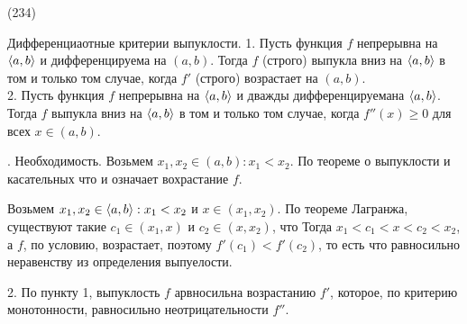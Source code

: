(234)

\T \q Дифференциаотные критерии выпуклости. 1. Пусть функция $f$ непрерывна на $\langle a, b \rangle$ и дифференцируема на $(a, b)$. Тогда $f$ (строго) выпукла вниз на $\langle a, b \rangle$ в том и только том случае, когда $f'$ (строго) возрастает на $(a, b)$.\\
2. Пусть функция $f$ непрерывна на $\langle a, b \rangle$ и дважды дифференцируемана $\langle a, b \rangle$. Тогда $f$ выпукла вниз на $\langle a, b \rangle$ в том и только том случае, когда $f''(x) \ge 0$ для всех $x \in (a, b)$.

. Необходимость. Возьмем $x_1, x_2 \in (a, b): x_1 < x_2$. По теореме о выпуклости и касательных  что и означает вохрастание $f$.

Возьмем $x_1, x_2 \in \langle a, b \rangle: x_1 < x_2$ и $x \in (x_1, x_2)$. По теореме Лагранжа, существуют такие $c_1 \in (x_1, x)$ и $c_2 \in (x, x_2)$, что  Тогда $x_1 < c_1 < x < c_2 < x_2$, а $f$, по условию, возрастает, поэтому $f'(c_1) < f'(c_2)$, то есть  что равносильно неравенству из определения выпуелости.

2. По пункту 1, выпуклость $f$ арвносильна возрастанию $f'$, которое, по критерию монотонности, равносильно неотрицательности $f''$.